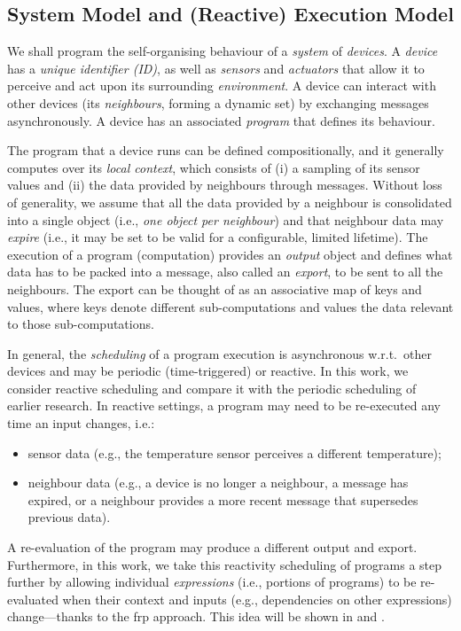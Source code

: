 \subsection{System Model and (Reactive) Execution Model}
\label{acsos2023-frp:sec:sys-model}

%

We shall program the self-organising behaviour of a \emph{system} of \emph{devices}.
%
A \emph{device} 
 has a \emph{unique identifier (ID)},
 as well as
 \emph{sensors} and \emph{actuators}
 that allow it to perceive and act upon its surrounding \emph{environment}.
%
A device can interact with other devices (its \emph{neighbours}, forming a dynamic set)
 by exchanging messages asynchronously.
%
A device has an associated \emph{program}
 that defines its behaviour.

The program that a device runs
 can be defined compositionally, and it
 generally computes over
 its \emph{local context},
 which consists of 
 (i) a sampling of its sensor values
 and 
 (ii) the data provided by neighbours through messages.
%
Without loss of generality, we assume that all the data provided by a neighbour is consolidated into a single object
(i.e., \emph{one object per neighbour})
and that neighbour data may \emph{expire}
(i.e., it may be set to be valid for a configurable, limited lifetime).
%
The execution of a program (computation) provides an \emph{output} object
 and defines what data has to be packed into a message, also called an \emph{export}, to be sent to all the neighbours.
%
The export can be thought of as an associative map of keys and values,
where keys denote different sub-computations and values the data relevant to those sub-computations.

In general, the \emph{scheduling} of a program execution 
is asynchronous w.r.t.\ other devices
  and may be periodic (time-triggered)
  or reactive.
%
In this work, we consider reactive scheduling
and compare it with the periodic scheduling of earlier research.
%
In reactive settings, 
 a program may need to be re-executed any time an input changes, i.e.:
%
\begin{itemize}
\item sensor data (e.g., the temperature sensor perceives a different temperature);
\item neighbour data
    (e.g., a device is no longer a neighbour,
    a message has expired,
    or a neighbour provides a more recent message that supersedes previous data).
\end{itemize}
%
A re-evaluation of the program
 may produce a different output and export.  
%
Furthermore, 
 in this work, we take this reactivity scheduling of programs a step further
 by allowing individual \emph{expressions} (i.e., portions of programs)
 to be re-evaluated when their context and inputs (e.g., dependencies on other expressions) change---thanks to the \ac{frp} approach.
%
This idea will be shown in  and .

